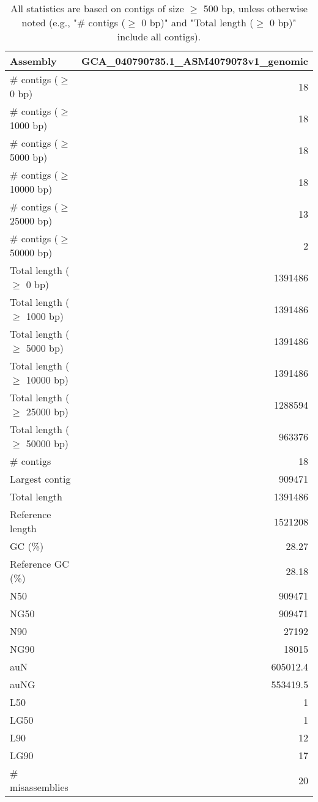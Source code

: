 \documentclass[12pt,a4paper]{article}
\begin{document}
\begin{table}[ht]
\begin{center}
\caption{All statistics are based on contigs of size $\geq$ 500 bp, unless otherwise noted (e.g., "\# contigs ($\geq$ 0 bp)" and "Total length ($\geq$ 0 bp)" include all contigs).}
\begin{tabular}{|l*{1}{|r}|}
\hline
Assembly & GCA\_040790735.1\_ASM4079073v1\_genomic \\ \hline
\# contigs ($\geq$ 0 bp) & 18 \\ \hline
\# contigs ($\geq$ 1000 bp) & 18 \\ \hline
\# contigs ($\geq$ 5000 bp) & 18 \\ \hline
\# contigs ($\geq$ 10000 bp) & 18 \\ \hline
\# contigs ($\geq$ 25000 bp) & 13 \\ \hline
\# contigs ($\geq$ 50000 bp) & 2 \\ \hline
Total length ($\geq$ 0 bp) & 1391486 \\ \hline
Total length ($\geq$ 1000 bp) & 1391486 \\ \hline
Total length ($\geq$ 5000 bp) & 1391486 \\ \hline
Total length ($\geq$ 10000 bp) & 1391486 \\ \hline
Total length ($\geq$ 25000 bp) & 1288594 \\ \hline
Total length ($\geq$ 50000 bp) & 963376 \\ \hline
\# contigs & 18 \\ \hline
Largest contig & 909471 \\ \hline
Total length & 1391486 \\ \hline
Reference length & 1521208 \\ \hline
GC (\%) & 28.27 \\ \hline
Reference GC (\%) & 28.18 \\ \hline
N50 & 909471 \\ \hline
NG50 & 909471 \\ \hline
N90 & 27192 \\ \hline
NG90 & 18015 \\ \hline
auN & 605012.4 \\ \hline
auNG & 553419.5 \\ \hline
L50 & 1 \\ \hline
LG50 & 1 \\ \hline
L90 & 12 \\ \hline
LG90 & 17 \\ \hline
\# misassemblies & 20 \\ \hline

\end{tabular}
\end{center}
\end{table}
\end{document}
